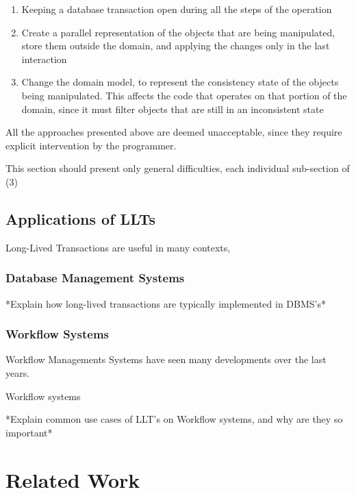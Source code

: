 \documentclass{llncs}
\begin{document}
\begin{enumerate}
\item Keeping a database transaction open during all the steps of the
  operation

\item Create a parallel representation of the objects that are being
  manipulated, store them outside the domain, and applying the changes
  only in the last interaction

\item Change the domain model, to represent the consistency state of
  the objects being manipulated. This affects the code that operates
  on that portion of the domain, since it must filter objects that are
  still in an inconsistent state
\end{enumerate}

All the approaches presented above are deemed unacceptable, since they
require explicit intervention by the programmer. 

This section should present only general difficulties, each individual
sub-section of (3)

\subsection{Applications of LLTs}

Long-Lived Transactions are useful in many contexts, 

\subsubsection{Database Management Systems}

*Explain how long-lived transactions are typically implemented in DBMS's*

\subsubsection{Workflow Systems}

Workflow Managements Systems have seen many developments over the last
years.

Workflow systems 

*Explain common use cases of LLT's on Workflow systems, and why are
they so important*


\section{Related Work}
\end{document}
